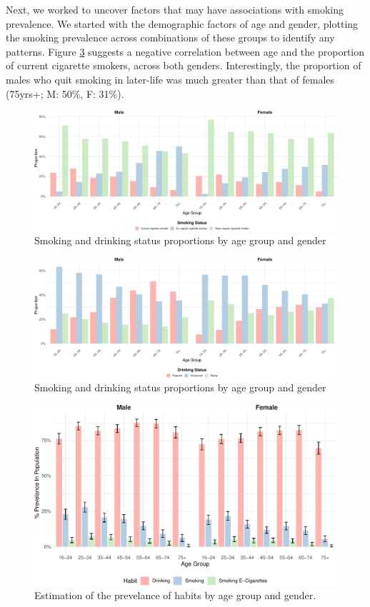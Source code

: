 \documentclass[
  11pt,
  twocolumn]{article}
\begin{document}
Next, we worked to uncover factors that may have associations with
smoking prevalence. We started with the demographic factors of age and
gender, plotting the smoking prevalence across combinations of these
groups to identify any patterns. Figure \ref{fig:output-prevelance-plot}
suggests a negative correlation between age and the proportion of
current cigarette smokers, across both genders. Interestingly, the
proportion of males who quit smoking in later-life was much greater than
that of females (75yrs+; M: 50\%, F: 31\%).

\begin{figure}[H]
\includegraphics{Coursework_files/figure-latex/output-smoking-drinking-age-plot-1} \caption{Smoking and drinking status proportions by age group and gender}\label{fig:output-smoking-drinking-age-plot-1}
\end{figure}
\begin{figure}[H]
\includegraphics{Coursework_files/figure-latex/output-smoking-drinking-age-plot-2} \caption{Smoking and drinking status proportions by age group and gender}\label{fig:output-smoking-drinking-age-plot-2}
\end{figure}

\begin{figure}[H]
\includegraphics{Coursework_files/figure-latex/output-prevelance-plot-1} \caption{Estimation of the prevelance of habits by age group and gender.}\label{fig:output-prevelance-plot}
\end{figure}
\end{document}
